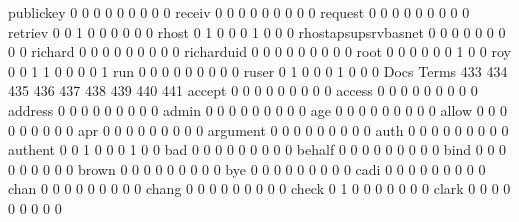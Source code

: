 \documentclass[compress,8pt]{beamer}
\begin{document}
\begin{frame}
\begin{Schunk}
  publickey                                  0   0   0   0   0   0   0   0   0
  receiv                                     0   0   0   0   0   0   0   0   0
  request                                    0   0   0   0   0   0   0   0   0
  retriev                                    0   0   1   0   0   0   0   0   0
  rhost                                      0   1   0   0   0   1   0   0   0
  rhostapsupsrvbasnet                        0   0   0   0   0   0   0   0   0
  richard                                    0   0   0   0   0   0   0   0   0
  richarduid                                 0   0   0   0   0   0   0   0   0
  root                                       0   0   0   0   0   0   1   0   0
  roy                                        0   0   1   1   0   0   0   0   1
  run                                        0   0   0   0   0   0   0   0   0
  ruser                                      0   1   0   0   0   1   0   0   0
                                          Docs
Terms                                      433 434 435 436 437 438 439 440 441
  accept                                     0   0   0   0   0   0   0   0   0
  access                                     0   0   0   0   0   0   0   0   0
  address                                    0   0   0   0   0   0   0   0   0
  admin                                      0   0   0   0   0   0   0   0   0
  age                                        0   0   0   0   0   0   0   0   0
  allow                                      0   0   0   0   0   0   0   0   0
  apr                                        0   0   0   0   0   0   0   0   0
  argument                                   0   0   0   0   0   0   0   0   0
  auth                                       0   0   0   0   0   0   0   0   0
  authent                                    0   0   1   0   0   0   1   0   0
  bad                                        0   0   0   0   0   0   0   0   0
  behalf                                     0   0   0   0   0   0   0   0   0
  bind                                       0   0   0   0   0   0   0   0   0
  brown                                      0   0   0   0   0   0   0   0   0
  bye                                        0   0   0   0   0   0   0   0   0
  cadi                                       0   0   0   0   0   0   0   0   0
  chan                                       0   0   0   0   0   0   0   0   0
  chang                                      0   0   0   0   0   0   0   0   0
  check                                      0   1   0   0   0   0   0   0   0
  clark                                      0   0   0   0   0   0   0   0   0

\end{Schunk}
\end{frame}
\end{document}
